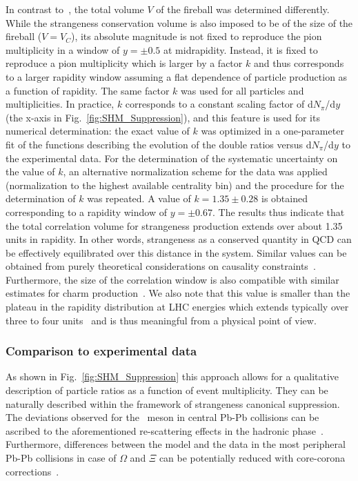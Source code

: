 In contrast to~\cite{Adam:2015vsf}, the total volume $V$ of the fireball was determined differently. While the strangeness conservation volume is also imposed to be of the size of the fireball ($V=V_C$), its absolute magnitude is not fixed to reproduce the pion multiplicity in a window of $y = \pm 0.5$ at midrapidity. Instead, it is fixed to reproduce a pion multiplicity which is larger by a factor $k$ and thus corresponds to a larger rapidity window assuming a flat dependence of particle production as a function of rapidity. The same factor $k$ was used for all particles and multiplicities. In practice, $k$ corresponds to a constant scaling factor of d$N_{\pi}$/d$y$ (the x-axis in Fig.~\ref{fig:SHM_Suppression}), and this feature is used for its numerical determination: the exact value of $k$ was optimized in a one-parameter fit of the functions describing the evolution of the double ratios versus d$N_{\pi}$/d$y$ to the experimental data.  For the determination of the systematic uncertainty on the value of $k$, an alternative normalization scheme for the data was applied (normalization to the highest available centrality bin) and the procedure for the determination of $k$ was repeated. A value of $k=1.35 \pm 0.28$ is obtained corresponding to a rapidity window of $y = \pm 0.67$. The results thus indicate that the total correlation volume for strangeness production extends over about 1.35 units in rapidity. In other words, strangeness as a conserved quantity in QCD can be effectively equilibrated over this distance in the system. Similar values can be obtained from purely theoretical considerations on causality constraints~\cite{Castorina:2013mba}. Furthermore, the size of the correlation window is also compatible with similar estimates for charm production~\cite{Andronic:2003zv,Andronic:2006ky}. We also note that this value is smaller than the plateau in the rapidity distribution at LHC energies which extends typically over three to four units~\cite{Adam:2015gka,Abbas:2013bpa} and is thus meaningful from a physical point of view.
 

\subsubsection{Comparison to experimental data} 

As shown in Fig.~\ref{fig:SHM_Suppression} this approach allows for a qualitative description of particle ratios as a function of event multiplicity. They can be naturally described within the framework of strangeness canonical suppression. The deviations observed for the \kstar\ meson in central Pb-Pb collisions can be ascribed to the aforementioned re-scattering effects in the hadronic phase~\cite{Knospe:2015nva}. Furthermore, differences between the model and the data in the most peripheral Pb-Pb collisions in case of $\Omega$ and $\Xi$ can be potentially reduced with core-corona corrections~\cite{Aichelin:2008mi}. 
 
